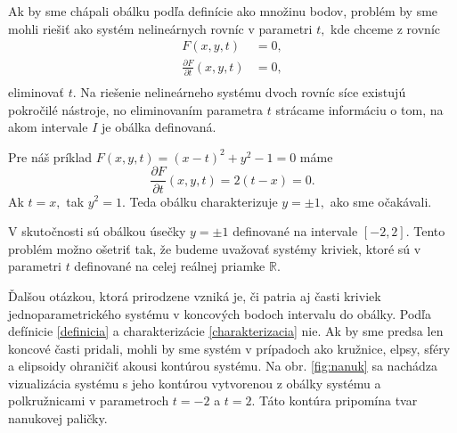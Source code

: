 Ak by sme chápali obálku podľa definície ako množinu bodov, problém by sme mohli riešiť ako systém nelineárnych rovníc v parametri $t,$ kde chceme z rovníc 
\begin{align*}
F(x,y,t) &= 0, \\
\frac{\partial F}{\partial t}(x, y, t) &= 0, \\
\end{align*}
eliminovať $t.$ Na riešenie nelineárneho systému dvoch rovníc síce existujú pokročilé nástroje, no eliminovaním parametra $t$ strácame informáciu o tom, na akom intervale $I$ je obálka definovaná. 

\begin{example}
Pre náš príklad $ F(x, y, t) = (x - t)^2 + y^2 - 1 = 0 $ máme 
$$\frac{\partial F}{\partial t}(x, y, t) = 2(t-x) = 0. $$
Ak $t = x, $ tak $y^2 = 1.$ Teda obálku charakterizuje $ y = \pm 1, $ ako sme očakávali.
\end{example}


V skutočnosti sú obálkou úsečky $y=\pm 1$ definované na intervale $[-2,2]$. Tento problém možno ošetriť tak, že budeme uvažovať systémy kriviek, ktoré sú v parametri $t$ definované na celej reálnej priamke $\mathbb{R}$. 


Ďalšou otázkou, ktorá prirodzene vzniká je, či patria aj časti kriviek jednoparametrického systému v koncových bodoch intervalu do obálky. Podľa defínicie \ref{definicia} a charakterizácie \ref{charakterizacia} nie. Ak by sme predsa len koncové časti pridali, mohli by sme systém v prípadoch ako kružnice, elpsy, sféry a elipsoidy ohraničiť akousi kontúrou systému. Na obr. \ref{fig:nanuk} sa nachádza vizualizácia systému s jeho kontúrou vytvorenou z obálky systému a polkružnicami v parametroch $t=-2$ a $t=2.$ Táto kontúra pripomína tvar nanukovej paličky.

